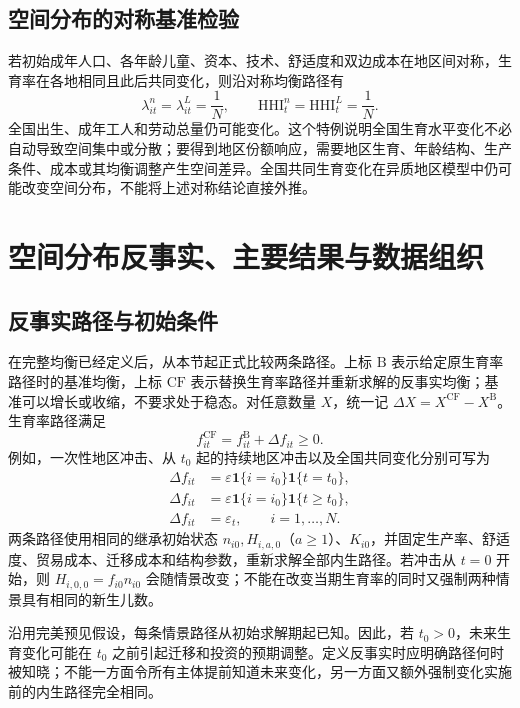 \documentclass[UTF8,a4paper,zihao=-4,fontset=windows]{ctexart}
\numberwithin{equation}{section}
\begin{document}
\subsection{空间分布的对称基准检验}
若初始成年人口、各年龄儿童、资本、技术、舒适度和双边成本在地区间对称，生育率在各地相同且此后共同变化，则沿对称均衡路径有
\begin{equation}
 \lambda^n_{it}=\lambda^L_{it}=\frac1N,\qquad
 \mathrm{HHI}^n_t=\mathrm{HHI}^L_t=\frac1N.
 \label{eq:lg-symmetric-distribution}
\end{equation}
全国出生、成年工人和劳动总量仍可能变化。这个特例说明全国生育水平变化不必自动导致空间集中或分散；要得到地区份额响应，需要地区生育、年龄结构、生产条件、成本或其均衡调整产生空间差异。全国共同生育变化在异质地区模型中仍可能改变空间分布，不能将上述对称结论直接外推。

\section{空间分布反事实、主要结果与数据组织}
\label{sec:lg-counterfactual}

\subsection{反事实路径与初始条件}
在完整均衡已经定义后，从本节起正式比较两条路径。上标 $\mathrm B$ 表示给定原生育率路径时的基准均衡，上标 $\mathrm{CF}$ 表示替换生育率路径并重新求解的反事实均衡；基准可以增长或收缩，不要求处于稳态。对任意数量 $X$，统一记 $\Delta X=X^{\mathrm{CF}}-X^{\mathrm B}$。生育率路径满足
\begin{equation}
 f^{\mathrm{CF}}_{it}=f^{\mathrm B}_{it}+\Delta f_{it}\geq0.
 \label{eq:lg-counterfactual-fertility}
\end{equation}
例如，一次性地区冲击、从 $t_0$ 起的持续地区冲击以及全国共同变化分别可写为
\begin{align}
 \Delta f_{it}&=\varepsilon\mathbf1\{i=i_0\}\mathbf1\{t=t_0\},\\
 \Delta f_{it}&=\varepsilon\mathbf1\{i=i_0\}\mathbf1\{t\geq t_0\},\\
 \Delta f_{it}&=\varepsilon_t,\qquad i=1,\ldots,N.
\end{align}
两条路径使用相同的继承初始状态 $n_{i0},H_{i,a,0}$（$a\geq1$）、$K_{i0}$，并固定生产率、舒适度、贸易成本、迁移成本和结构参数，重新求解全部内生路径。若冲击从 $t=0$ 开始，则 $H_{i,0,0}=f_{i0}n_{i0}$ 会随情景改变；不能在改变当期生育率的同时又强制两种情景具有相同的新生儿数。

沿用完美预见假设，每条情景路径从初始求解期起已知。因此，若 $t_0>0$，未来生育变化可能在 $t_0$ 之前引起迁移和投资的预期调整。定义反事实时应明确路径何时被知晓；不能一方面令所有主体提前知道未来变化，另一方面又额外强制变化实施前的内生路径完全相同。
\end{document}
